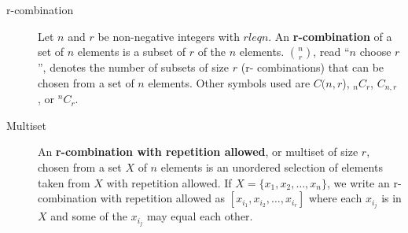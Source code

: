 \documentclass{article}
\begin{document}
\begin{description}
	\item[r-combination] Let $n$ and $r$ be non-negative integers with $rleq n$.
An \textbf{r-combination} of a set of $n$ elements is a subset of $r$ of the $n$ elements. ${n\choose r}$, read “$n$ choose $r$”, denotes the number of subsets of size $r$ (r- combinations) that can be chosen from a set of $n$ elements. Other symbols used are $C(n, r$), $_{n}C_{r}$, $C_{n,r}$ , or $^{n}C_{r}$.
	\item[Multiset]An \textbf{r-combination with repetition allowed}, or multiset of size $r$, chosen from a set $X$ of $n$ elements is an unordered selection of elements taken from $X$ with repetition allowed. If $X=\{x_{1},x_{2},\dots,x_{n}\}$, we write an r-combination with repetition allowed as $[x_{i_{1}},x_{i_{2}}, \dots, x_{i_{r}}]$ where each $x_{i_{j}}$ is in $X$ and some of the $x_{i_{j}}$ may equal each other.

	
\end{description}


\newpage
\end{document}

